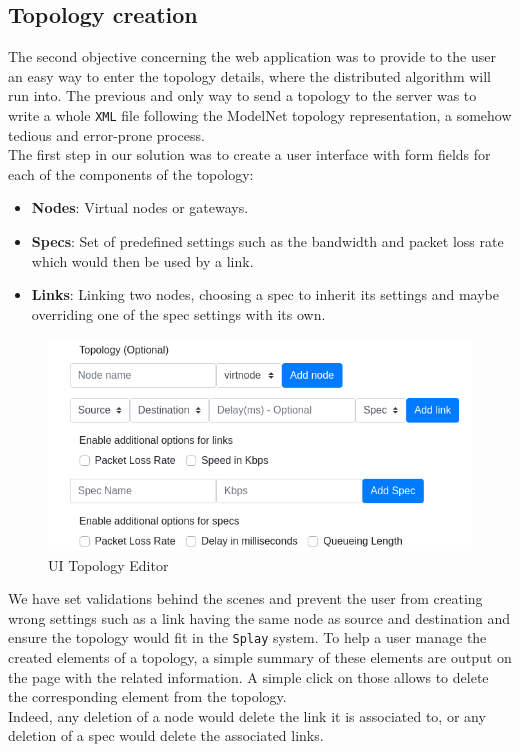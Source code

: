 \documentclass{eplmastersthesis}
\begin{document}
      \subsection{Topology creation}

        The second objective concerning the web application was to provide to the
        user an easy way to enter the topology details, where the distributed algorithm
        will run into. The previous and only way to send a topology
        to the server was to write a whole \texttt{XML} file following the ModelNet
        topology representation, a somehow tedious and error-prone process.\\

        The first step in our solution was to create a user interface with
        form fields for each of the components of the topology:

        \begin{itemize}
          \item \textbf{Nodes}: Virtual nodes or gateways.
          \item \textbf{Specs}: Set of predefined settings such as the
          bandwidth and packet loss rate which would then be used by
          a link.
          \item \textbf{Links}: Linking two nodes, choosing a spec to
          inherit its settings and maybe overriding one of the spec settings
          with its own.
        \end{itemize}

        \begin{figure}[H]
          \centering
          \includegraphics[scale=0.6]{figures/editor_topology.png}
          \caption{\label{editor_topology} UI Topology Editor}
        \end{figure}

        We have set validations behind the scenes and
        prevent the user from creating wrong settings such as a link having the
        same node as source and destination and ensure the topology would
        fit in the \texttt{Splay} system. To help a user manage the created
        elements of a topology, a simple summary of these elements are
        output on the page with the related information. A simple click on those
        allows to delete the corresponding element from the topology.\\
        Indeed, any deletion of a node would delete the link it is associated
        to, or any deletion of a spec would delete the associated links.\\
\end{document}
